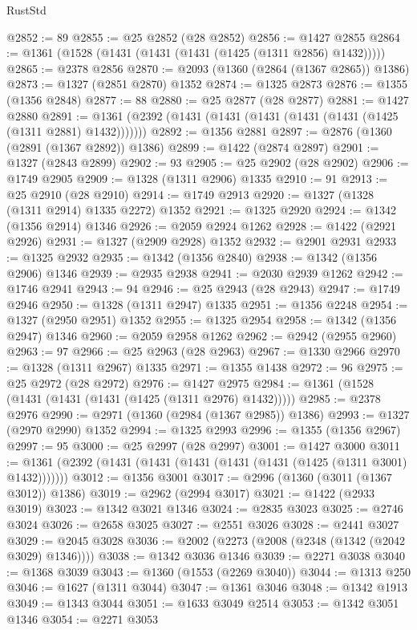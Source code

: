 \begin{lexlean}{RustStd}
\begin{coremodule}
@2852 := 89
@2855 := @25 @2852 (@28 @2852)
@2856 := @1427 @2855
@2864 := @1361 (@1528 (@1431 (@1431 (@1431 (@1425 (@1311 @2856) @1432)))))
@2865 := @2378 @2856
@2870 := @2093 (@1360 (@2864 (@1367 @2865)) @1386)
@2873 := @1327 (@2851 @2870) @1352
@2874 := @1325 @2873
@2876 := @1355 (@1356 @2848)
@2877 := 88
@2880 := @25 @2877 (@28 @2877)
@2881 := @1427 @2880
@2891 := @1361 (@2392 (@1431 (@1431 (@1431 (@1431 (@1431 (@1425 (@1311 @2881) @1432)))))))
@2892 := @1356 @2881
@2897 := @2876 (@1360 (@2891 (@1367 @2892)) @1386)
@2899 := @1422 (@2874 @2897)
@2901 := @1327 (@2843 @2899)
@2902 := 93
@2905 := @25 @2902 (@28 @2902)
@2906 := @1749 @2905
@2909 := @1328 (@1311 @2906) @1335
@2910 := 91
@2913 := @25 @2910 (@28 @2910)
@2914 := @1749 @2913
@2920 := @1327 (@1328 (@1311 @2914) @1335 @2272) @1352
@2921 := @1325 @2920
@2924 := @1342 (@1356 @2914) @1346
@2926 := @2059 @2924 @1262
@2928 := @1422 (@2921 @2926)
@2931 := @1327 (@2909 @2928) @1352
@2932 := @2901 @2931
@2933 := @1325 @2932
@2935 := @1342 (@1356 @2840)
@2938 := @1342 (@1356 @2906) @1346
@2939 := @2935 @2938
@2941 := @2030 @2939 @1262
@2942 := @1746 @2941
@2943 := 94
@2946 := @25 @2943 (@28 @2943)
@2947 := @1749 @2946
@2950 := @1328 (@1311 @2947) @1335
@2951 := @1356 @2248
@2954 := @1327 (@2950 @2951) @1352
@2955 := @1325 @2954
@2958 := @1342 (@1356 @2947) @1346
@2960 := @2059 @2958 @1262
@2962 := @2942 (@2955 @2960)
@2963 := 97
@2966 := @25 @2963 (@28 @2963)
@2967 := @1330 @2966
@2970 := @1328 (@1311 @2967) @1335
@2971 := @1355 @1438
@2972 := 96
@2975 := @25 @2972 (@28 @2972)
@2976 := @1427 @2975
@2984 := @1361 (@1528 (@1431 (@1431 (@1431 (@1425 (@1311 @2976) @1432)))))
@2985 := @2378 @2976
@2990 := @2971 (@1360 (@2984 (@1367 @2985)) @1386)
@2993 := @1327 (@2970 @2990) @1352
@2994 := @1325 @2993
@2996 := @1355 (@1356 @2967)
@2997 := 95
@3000 := @25 @2997 (@28 @2997)
@3001 := @1427 @3000
@3011 := @1361 (@2392 (@1431 (@1431 (@1431 (@1431 (@1431 (@1425 (@1311 @3001) @1432)))))))
@3012 := @1356 @3001
@3017 := @2996 (@1360 (@3011 (@1367 @3012)) @1386)
@3019 := @2962 (@2994 @3017)
@3021 := @1422 (@2933 @3019)
@3023 := @1342 @3021 @1346
@3024 := @2835 @3023
@3025 := @2746 @3024
@3026 := @2658 @3025
@3027 := @2551 @3026
@3028 := @2441 @3027
@3029 := @2045 @3028
@3036 := @2002 (@2273 (@2008 (@2348 (@1342 (@2042 @3029) @1346))))
@3038 := @1342 @3036 @1346
@3039 := @2271 @3038
@3040 := @1368 @3039
@3043 := @1360 (@1553 (@2269 @3040))
@3044 := @1313 @250
@3046 := @1627 (@1311 @3044)
@3047 := @1361 @3046
@3048 := @1342 @1913
@3049 := @1343 @3044
@3051 := @1633 @3049 @2514
@3053 := @1342 @3051 @1346
@3054 := @2271 @3053

\end{coremodule}
\end{lexlean}
